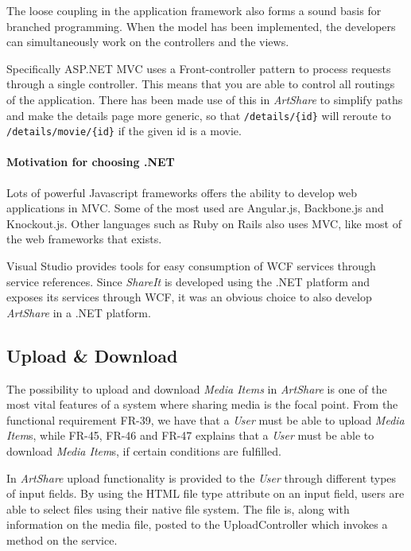 \documentclass[../report.tex]{subfiles}
\begin{document}
The loose coupling in the application framework also forms a sound basis for branched programming. When the model has been implemented, the developers can simultaneously work on the controllers and the views.

Specifically ASP.NET MVC uses a Front-controller pattern to process requests through a single controller. This means that you are able to control all routings of the application. There has been made use of this in \textit{ArtShare} to simplify paths and make the details page more generic, so that \texttt{/details/\{id\}} will reroute to \texttt{/details/movie/\{id\}} if the given id is a movie.

\paragraph{Motivation for choosing .NET}
Lots of powerful Javascript frameworks offers the ability to develop web applications in MVC. Some of the most used are Angular.js, Backbone.js and Knockout.js. Other languages such as Ruby on Rails also uses MVC, like most of the web frameworks that exists.

Visual Studio provides tools for easy consumption of WCF services through service references\cite{microsoftWCF}.
Since \textit{ShareIt} is developed using the .NET platform and exposes its services through WCF, it was an obvious choice to also develop \textit{ArtShare} in a .NET platform.

\subsection{Upload \& Download}

The possibility to upload and download \textit{Media Items} in \textit{ArtShare} is one of the most vital features of a system where sharing media is the focal point. From the functional requirement FR-39, we have that a \textit{User} must be able to upload \textit{Media Item}s, while FR-45, FR-46 and FR-47 explains that a \textit{User} must be able to download \textit{Media Item}s, if certain conditions are fulfilled.

In \textit{ArtShare} upload functionality is provided to the \textit{User} through different types of input fields. By using the HTML file type attribute\cite{w3schools2014} on an input field, users are able to select files using their native file system. The file is, along with information on the media file, posted to the UploadController which invokes a method on the service.
\end{document}

